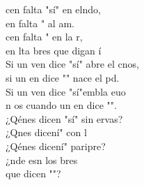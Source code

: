 \documentclass[12pt]{article}
\begin{document}
\begin{multicols*}{2}
\begin{cancion}%
	cen falta "sí" en elndo, \\
	en falta " al am.\\
	cen falta " en la r,  \\
	en lta bres que digan í\\
	Si un ven dice "sí" abre el cnos,\\
	si un en dice "" nace el pd.\\
	Si un ven dice "sí"embla euo\\
	n os cuando un en dice "". \\
	¿Qénes dicen "sí" sin ervas?\\
	¿Qnes dicení" con l \\
	¿Qénes dicení" paripre? \\
	¿nde esn los bres   \\
	que dicen ""? \\
\end{cancion}%


\end{multicols*}
\end{document}
